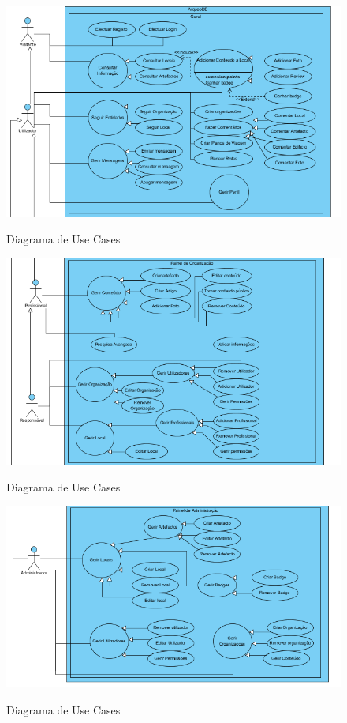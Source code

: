 \documentclass[12pt,a4paper]{article}
\begin{document}
\begin{figure}[h!]
\centering
\includegraphics[scale=1]{usecase/geral1}
\label{usecase}
\caption{Diagrama de Use Cases}
\end{figure}

\begin{figure}[h!]
\centering
\includegraphics[scale=1]{usecase/geral2}
\label{usecase}
\caption{Diagrama de Use Cases}
\end{figure}

\begin{figure}[h!]
\centering
\includegraphics[scale=1]{usecase/geral3}
\label{usecase}
\caption{Diagrama de Use Cases}
\end{figure}
\end{document}
